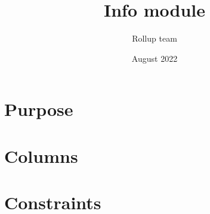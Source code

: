 \documentclass{article}
\title{Info module}
\author{Rollup team}
\date{August 2022}
\begin{document}
\maketitle
\tableofcontents

\section{Purpose}
	

\section{Columns}
	

\section{Constraints}
	
\end{document}
